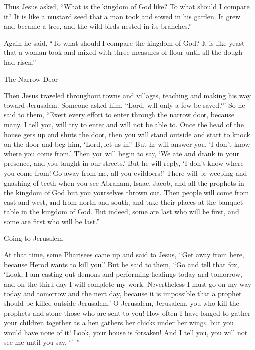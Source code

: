{\par }{\PP {}Thus
Jesus asked, “What
is
the kingdom
of God
like? To what
should I compare
it?
It is
like
a mustard
seed
that
a man
took
and
sowed
in
his
garden.
It grew
and
became
a tree,
and
the wild birds
nested
in
its
branches.”
\par }{\PP {}Again
he said,
“To what
should I compare
the kingdom
of God?
It is
like
yeast
that
a woman
took
and mixed
with
three
measures
of flour
until
all
the dough had risen.”
\par }{\SH The Narrow Door
\par }{\PP {}Then
Jesus traveled
throughout
towns
and
villages,
teaching
and
making
his way
toward
Jerusalem.
Someone
asked
him,
“Lord,
will
only
a few
be saved?” So
he said
to
them,
“Exert
every effort to enter
through
the narrow
door,
because
many,
I tell
you,
will try
to enter
and
will
not
be able to.
Once the head of the house
gets up
and
shuts
the door,
then you will stand
outside
and
start
to knock
on the door
and beg
him, ‘Lord,
let
us
in!’ But
he will answer
you, ‘I
don’t
know
where
you
come from.’
Then
you will begin
to say,
‘We ate
and
drank
in
your
presence,
and
you taught
in our
streets.’
But
he will reply, ‘I
don’t
know
where
you
come from! Go away
from
me,
all
you evildoers!’
There
will be
weeping
and
gnashing
of teeth
when
you see
Abraham,
Isaac,
Jacob,
and
all
the prophets
in
the kingdom
of God
but
you
yourselves thrown
out.
Then
people will come
from
east
and
west,
and
from
north
and
south,
and
take
their places at the banquet table
in
the kingdom
of God.
But
indeed,
some are
last
who
will be
first,
and
some are
first
who
will be
last.”
\par }{\SH Going to Jerusalem
\par }{\PP {}At
that
time,
some
Pharisees
came up
and said
to Jesus, “Get away from
here,
because
Herod
wants
to kill
you.”
But
he said
to them,
“Go
and tell
that
fox, ‘Look,
I am casting out
demons
and
performing
healings
today
and
tomorrow,
and
on the third
day I will complete my work.
Nevertheless
I
must
go on
my way today
and
tomorrow
and
the next day,
because
it is impossible
that a prophet
should be killed
outside
Jerusalem.’
O Jerusalem,
Jerusalem,
you who kill
the prophets
and
stone
those who are sent
to
you! How often
I have longed
to gather
your
children
together
as
a hen
gathers her
chicks
under
her wings,
but
you would have
none of it!
Look,
your
house
is forsaken! And I tell
you,
you will not see me until you say, ‘{}’ ”

}
